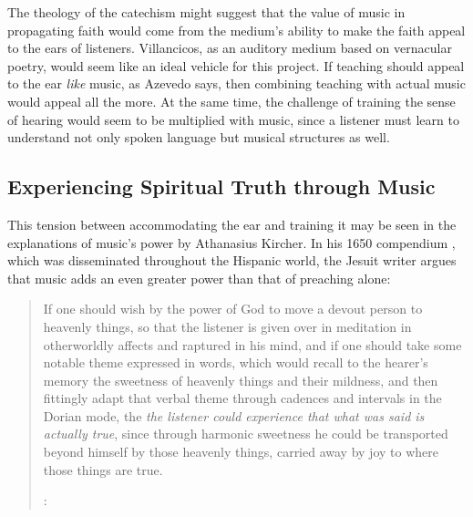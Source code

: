 The theology of the catechism might suggest that the value of music in propagating faith would come from the medium's ability to make the faith appeal to the ears of listeners.
Villancicos, as an auditory medium based on vernacular poetry, would seem like an ideal vehicle for this project.
If teaching should appeal to the ear \emph{like} music, as Azevedo says, then combining teaching with actual music would appeal all the more.
At the same time, the challenge of training the sense of hearing would seem to be multiplied with music, since a listener must learn to understand not only spoken language but musical structures as well.

\subsection{Experiencing Spiritual Truth through Music}

This tension between accommodating the ear and training it may be seen in the explanations of music's power by Athanasius Kircher.
In his 1650 compendium , which was disseminated throughout the Hispanic world, the Jesuit writer argues that music adds an even greater power than that of preaching alone:
\begin{quote}
If one should wish by the power of God to move a devout person to heavenly things, so that the listener is given over in meditation in otherworldly affects and raptured in his mind,
and if one should take some notable theme expressed in words,
which would recall to the hearer's memory the sweetness of heavenly things and their mildness,
and then fittingly adapt that verbal theme through cadences and intervals in the Dorian mode,
the \emph{the listener could experience that what was said is actually true}, 
since through harmonic sweetness he could be transported beyond himself by those heavenly things,
carried away by joy to where those things are true.%
  \begin{Footnote}
  \autocite[bk.\~7, 550 (emphasis added)]{Kircher:Musurgia}:
  \end{Footnote}
\end{quote}

